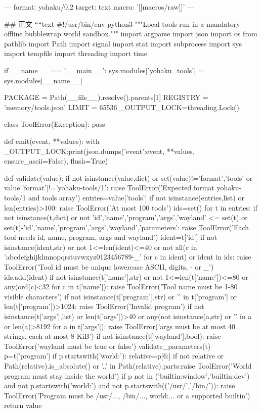 ---
format: yohaku/0.2
target: text
macro: '[[macros/raw]]'
---

## 正文
````text
#!/usr/bin/env python3
"""Local tools run in a mandatory offline bubblewrap world sandbox."""
import argparse
import json
import os
from pathlib import Path
import signal
import stat
import subprocess
import sys
import tempfile
import threading
import time

if __name__ == '__main__':
    sys.modules['yohaku_tools'] = sys.modules[__name__]

PACKAGE = Path(__file__).resolve().parents[1]
REGISTRY = 'memory/tools.json'
LIMIT = 65536
_OUTPUT_LOCK=threading.Lock()

class ToolError(Exception):
    pass

def emit(event, **values):
    with _OUTPUT_LOCK:print(json.dumps({'event':event, **values}, ensure_ascii=False), flush=True)

def validate(value):
    if not isinstance(value,dict) or set(value)!={'format','tools'} or value['format']!='yohaku-tools/1':
        raise ToolError('Expected format yohaku-tools/1 and tools array')
    entries=value['tools']
    if not isinstance(entries,list) or len(entries)>100:
        raise ToolError('At most 100 tools')
    ids=set()
    for t in entries:
        if not isinstance(t,dict) or not {'id','name','program','args','wayland'} <= set(t) or set(t)-{'id','name','program','args','wayland','parameters'}:
            raise ToolError('Each tool needs id, name, program, args and wayland')
        ident=t['id']
        if not isinstance(ident,str) or not 1<=len(ident)<=40 or not all(c in 'abcdefghijklmnopqrstuvwxyz0123456789-_' for c in ident) or ident in ids:
            raise ToolError('Tool id must be unique lowercase ASCII, digits, - or _')
        ids.add(ident)
        if not isinstance(t['name'],str) or not 1<=len(t['name'])<=80 or any(ord(c)<32 for c in t['name']):
            raise ToolError('Tool name must be 1-80 visible characters')
        if not isinstance(t['program'],str) or '\0' in t['program'] or len(t['program'])>1024:
            raise ToolError('Invalid program')
        if not isinstance(t['args'],list) or len(t['args'])>40 or any(not isinstance(a,str) or '\0' in a or len(a)>8192 for a in t['args']):
            raise ToolError('args must be at most 40 strings, each at most 8 KiB')
        if not isinstance(t['wayland'],bool):
            raise ToolError('wayland must be true or false')
        validate_parameters(t)
        p=t['program']
        if p.startswith('world:'):
            relative=p[6:]
            if not relative or Path(relative).is_absolute() or '..' in Path(relative).parts:raise ToolError('World program must stay inside the world')
        if p not in ('builtin:window','builtin:dev') and not p.startswith('world:') and not p.startswith(('/usr/','/bin/')):
            raise ToolError('Program must be /usr/..., /bin/..., world:... or a supported builtin')
    return value

